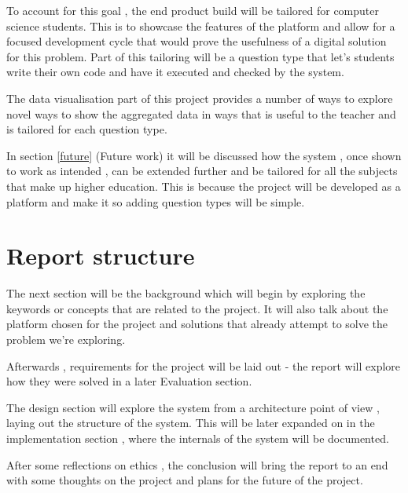 \documentclass[11pt]{informatics-report}
\begin{document}
To account for this goal , the end product build will be tailored for computer science students. This is to showcase the features of the platform and allow for a focused development cycle that would prove the usefulness of a digital solution for this problem. Part of this tailoring will be a question type that let's students write their own code and have it executed and checked by the system.

The data visualisation part of this project provides a number of ways to explore novel ways to show the aggregated data in ways that is useful to the teacher and is tailored for each question type.

In section \ref{future} (Future work) it will be discussed how the system , once shown to work as intended , can be extended further and be tailored for all the subjects that make up higher education. This is because the project will be developed as a platform and make it so adding question types will be simple.


\section{Report structure}
The next section will be the background which will begin by exploring the keywords or concepts that are related to the project. It will also talk about the platform chosen for the project and solutions that already attempt to solve the problem we're exploring.

Afterwards , requirements for the project will be laid out - the report will explore how they were solved in a later Evaluation section.

The design section will explore the system from a architecture point of view , laying out the structure of the system. This will be later expanded on in the implementation section , where the internals of the system will be documented.

After some reflections on ethics , the conclusion will bring the report to an end with some thoughts on the project and plans for the future of the project.












\appendix



\end{document}
